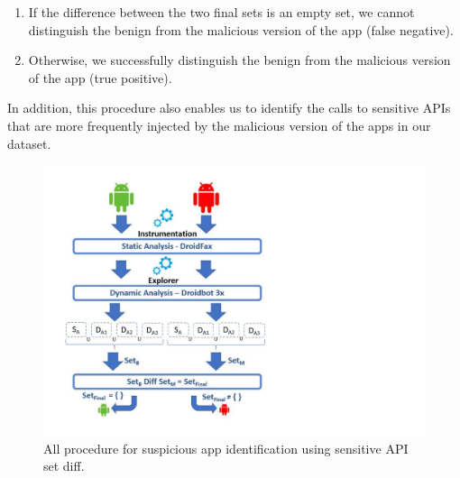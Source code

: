 \begin{enumerate}
    \item If the difference between the two final sets is an empty set, we cannot distinguish the benign from the malicious version of the app (false negative).
    \item Otherwise, we successfully distinguish the benign from the malicious version of the app (true positive). 
\end{enumerate}

In addition, this procedure also enables us to identify the calls to sensitive APIs that are more frequently injected by the malicious version of the apps
in our dataset. 


\begin{figure}[ht]
\centering
\includegraphics[scale=0.45]{images/sensitiveAPIdiff.pdf}
\caption{All procedure for suspicious app identification using sensitive API set diff.}
 \label{fig:sensitiveAPI}
\end{figure}





